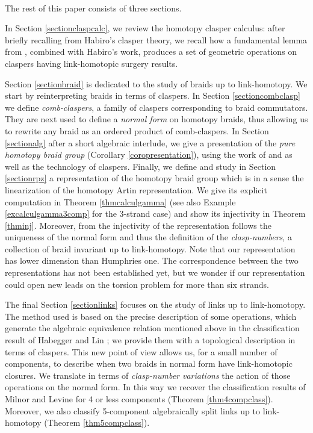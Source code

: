 \documentclass[11pt, a4paper, twoside,reqno]{amsart}
\begin{document}
\

The rest of this paper consists of three sections.

In Section \ref{sectionclaspcalc}, we review the homotopy clasper calculus: after briefly recalling from \cite{HabiroClasp} Habiro’s clasper theory, we recall how a fundamental lemma from \cite{Flemingyasuselfck}, combined with Habiro’s work, produces a set of geometric operations on claspers having link-homotopic surgery results.

Section \ref{sectionbraid} is dedicated to the study of braids up to link-homotopy. We start by reinterpreting braids in terms of claspers. In Section \ref{sectioncombclasp} we define \emph{comb-claspers}, a family of claspers corresponding to braid commutators. They are next used to define a \emph{normal form} on homotopy braids, thus allowing us to rewrite any braid as an ordered product of comb-claspers. In Section \ref{sectionalg} after a short algebraic interlude, we give a presentation of the \emph{pure homotopy braid group} (Corollary \ref{coropresentation}), using the work of \cite{GoldsmithHomotopybraids} and \cite{MurasugiKunioKurpitaStudyofbraid} as well as the technology of claspers. Finally, we define and study in Section \ref{sectionrpz} a representation of the homotopy braid group which is in a sense the linearization of the homotopy Artin representation. We give its explicit computation in Theorem \ref{thmcalculgamma} (see also Example \ref{excalculgamma3comp} for the 3-strand case) and show its injectivity in Theorem \ref{thminj}. Moreover, from the injectivity of the representation follows the uniqueness of the normal form and thus the definition of the \emph{clasp-numbers}, a collection of braid invariant up to link-homotopy. Note that our representation has lower dimension than Humphries one. The correspondence between the two representations has not been established yet, but we wonder if our representation could open new leads on the torsion problem for more than six strands. 

The final Section \ref{sectionlinks} focuses on the study of links up to link-homotopy. The method used is based on the precise description of some operations, which generate the algebraic equivalence relation mentioned above in the classification result of Habegger and Lin \cite{HabeggerLinHomotopy}; we provide them with a topological description in terms of claspers. This new point of view allows us, for a small number of components, to describe when two braids in normal form have link-homotopic closures. We translate in terms of \emph{clasp-number variations} the action of those operations on the normal form. In this way we recover the classification results of Milnor \cite{MilnorLinkgrp} and Levine \cite{Levine4comp} for 4 or less components (Theorem \ref{thm4compclass}). Moreover, we also classify 5-component algebraically split links up to link-homotopy (Theorem \ref{thm5compclass}).
\end{document}
